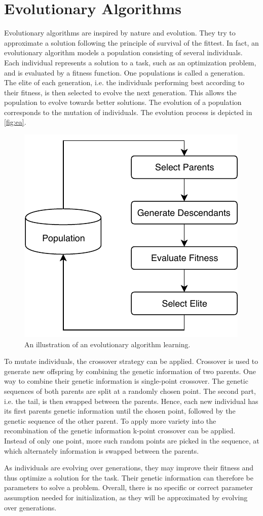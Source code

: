 \section{Evolutionary Algorithms}
\label{sec:ea}
Evolutionary algorithms are inspired by nature and evolution.
They try to approximate a solution following the principle of survival of the fittest.
In fact, an evolutionary algorithm models a population consisting of several individuals.
Each individual represents a solution to a task, such as an optimization problem, and is evaluated by a fitness function.
One populations is called a generation.
The elite of each generation, i.e. the individuals performing best according to their fitness, is then selected to evolve the next generation.
This allows the population to evolve towards better solutions.
The evolution of a population corresponds to the mutation of individuals.
The evolution process is depicted in \autoref{fig:ea}.

\begin{figure}[h]
\centering
\includegraphics[width=.7\columnwidth]{figures/ea_fig.pdf}
\caption{An illustration of an evolutionary algorithm learning. \cite{Dillmann2017}}
\label{fig:ea}
\end{figure}

To mutate individuals, the crossover strategy can be applied.
Crossover is used to generate new offspring by combining the genetic information of two parents.
One way to combine their genetic information is single-point crossover.
The genetic sequences of both parents are split at a randomly chosen point.
The second part, i.e. the tail, is then swapped between the parents.
Hence, each new individual has its first parents genetic information until the chosen point, followed by the genetic sequence of the other parent.
To apply more variety into the recombination of the genetic information k-point crossover can be applied.
Instead of only one point, more such random points are picked in the sequence, at which alternately information is swapped between the parents.
\cite{Dillmann2017}

As individuals are evolving over generations, they may improve their fitness and thus optimize a solution for the task.
Their genetic information can therefore be parameters to solve a problem.
Overall, there is no specific or correct parameter assumption needed for initialization, as they will be approximated by evolving over generations.
